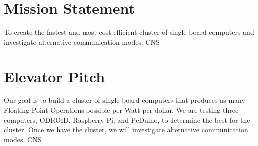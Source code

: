 
\section{Mission Statement}
To create the fastest and most cost efficient cluster of single-board computers and investigate alternative communication modes. CNS  

\section{Elevator Pitch}

Our goal is to build a cluster of single-board computers that produces as many Floating Point Operations possible per Watt per dollar. We are testing three computers, ODROID, Raspberry Pi, and PcDuino, to determine the best for the cluster. Once we have the cluster, we will investigate alternative communication modes. CNS

